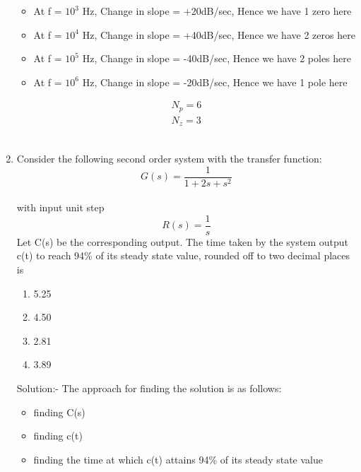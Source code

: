 \documentclass[journal,12pt,twocolumn]{IEEEtran}
\renewcommand\thesection{\arabic{section}}
\begin{document}
\begin{enumerate}[label=\arabic*.,ref=\thesection.\theenumi]
\begin{itemize}
    
    
\end{itemize}

\begin{itemize}
\item At f = $10^{3}$ Hz, Change in slope = +20dB/sec, Hence we have 1 zero here
\item At f = $10^{4}$ Hz, Change in slope = +40dB/sec, Hence we have 2 zeros here

    
\end{itemize}



\begin{itemize}

    \item At f = $10^{5}$ Hz, Change in slope = -40dB/sec, Hence we have 2 poles here
    \item At f = $10^{6}$ Hz, Change in slope = -20dB/sec, Hence we have 1 pole here
    
\end{itemize}

\begin{align}
N_{p} = 6 
\\ 
N_{z} = 3
\end{align}
\\
\item
Consider the following second order system with the transfer function:
$$G(s) = \frac{1}{1+2s+s^2}$$
\\with input unit step $$R(s) = \frac{1}{s}$$  Let C(s) be the corresponding output. The time taken by the system output c(t) to reach 94\% of its steady state value, rounded off to two decimal places is
\begin{enumerate}
\item 5.25
\item 4.50
\item 2.81
\item 3.89
\end{enumerate}



{Solution:- }
The approach for finding the solution is as follows:
\begin{itemize}
    \item finding C(s)
    \item finding c(t)
    \item finding the time at which c(t) attains 94\% of its steady state value
\end{itemize}


\end{enumerate}
\end{document}
